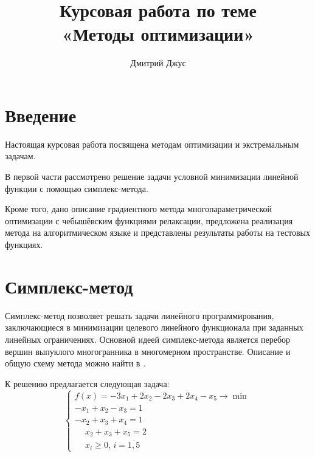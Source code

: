 \documentclass{article}
\renewcommand{\geq}{\geqslant}
\numberwithin{equation}{section}
\begin{document}
\author{Дмитрий Джус}
\title{Курсовая работа по теме \\
  \Huge{«Методы оптимизации»}}
\pretitle{\begin{center}\LARGE}
\posttitle{\par\end{center}\vskip 3pc}
\date{}
\maketitle
\thispagestyle{empty}

\clearpage
\tableofcontents

\clearpage
\section{Введение}

Настоящая курсовая работа посвящена методам оптимизации и
экстремальным задачам.

В первой части рассмотрено решение задачи условной минимизации
линейной функции с помощью симплекс-метода.

Кроме того, дано описание градиентного метода многопараметрической
оптимизации с чебышёвским функциями релаксации, предложена реализация
метода на алгоритмическом языке и представлены результаты работы на
тестовых функциях.

\section{Симплекс-метод}

Симплекс-метод позволяет решать задачи линейного программирования,
заключающиеся в минимизации целевого линейного функционала при
заданных линейных ограничениях. Основной идеей симплекс-метода
является перебор вершин выпуклого многогранника в многомерном
пространстве. Описание и общую схему метода можно найти в
\cite{taha05}.

К решению предлагается следующая задача:
\begin{equation}
  \label{eq:lp-initial}
  \begin{cases}
    f(x) = -3x_1+2x_2-2x_3+2x_4-x_5 \to \min \\
    -x_1+x_2-x_3=1 \\
    -x_2+x_3+x_4=1 \\
    \phantom{-}x_2+x_3+x_5=2 \\
    \phantom{-}x_i \geq 0,\, i = \overline{1, 5}
  \end{cases}
\end{equation}
\end{document}
